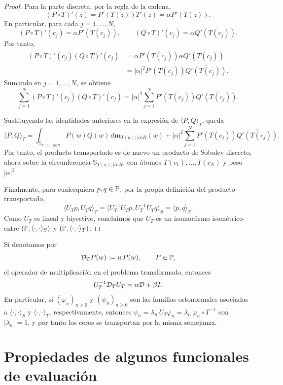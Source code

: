 \begin{proof}
	Para la parte discreta, por la regla de la cadena,
	\[
		(P\circ T)'(z)=P'(T(z))T'(z)=\alpha P'(T(z)).
	\]
	En particular, para cada $j=1,\dots,N$,
	\[
		(P\circ T)'(c_j)=\alpha P'(T(c_j)),
		\qquad
		(Q\circ T)'(c_j)=\alpha Q'(T(c_j)).
	\]
	Por tanto,
	\[
		\begin{aligned}
			(P\circ T)'(c_j)
			\overline{(Q\circ T)'(c_j)}
			 & =
			\alpha P'(T(c_j))
			\overline{\alpha Q'(T(c_j))} \\
			 & =
			|\alpha|^2
			P'(T(c_j))\overline{Q'(T(c_j))}.
		\end{aligned}
	\]
	Sumando en $j=1,\dots,N$, se obtiene
	\[
		\sum_{j=1}^N
		(P\circ T)'(c_j)\overline{(Q\circ T)'(c_j)}
		=
		|\alpha|^2
		\sum_{j=1}^N
		P'(T(c_j))\overline{Q'(T(c_j))}.
	\]

	Sustituyendo las identidades anteriores en la expresión de
	$\langle P,Q\rangle_T$, queda
	\[
		\langle P,Q\rangle_T
		=
		\int_{\mathbb S_{T(a),|\alpha|R}}
		P(w)\overline{Q(w)}\,d\mathbf m_{T(a);|\alpha|R}(w)
		+
		|\alpha|^2
		\sum_{j=1}^N
		P'(T(c_j))\overline{Q'(T(c_j))}.
	\]
	Por tanto, el producto transportado es de nuevo un producto de Sobolev
	discreto, ahora sobre la circunferencia $\mathbb S_{T(a),|\alpha|R}$, con
	átomos $T(c_1),\dots,T(c_N)$ y peso $|\alpha|^2$.

	Finalmente, para cualesquiera $p,q\in\mathbb{P}$, por la propia definición del
	producto transportado,
	\[
		\langle U_Tp,U_Tq\rangle_T
		=
		\langle U_T^{-1}U_Tp,U_T^{-1}U_Tq\rangle_S
		=
		\langle p,q\rangle_S.
	\]
	Como $U_T$ es lineal y biyectivo, concluimos que $U_T$ es un isomorfismo
	isométrico entre
	$(\mathbb{P},\langle\cdot,\cdot\rangle_S)$ y
	$(\mathbb{P},\langle\cdot,\cdot\rangle_T)$.
\end{proof}

\begin{rmk}
	Si denotamos por
	\[
		\mathcal D_T P(w):=wP(w),
		\qquad P\in\mathbb{P},
	\]
	el operador de multiplicación en el problema transformado, entonces
	\[
		U_T^{-1}\mathcal D_TU_T=\alpha\mathcal{D}+\beta I.
	\]
	En particular, si $(\varphi_n)_{n\ge 0}$ y $(\psi_n)_{n\ge 0}$ son las familias ortonormales asociadas a $\langle\cdot,\cdot\rangle_S$ y $\langle\cdot,\cdot\rangle_T$, respectivamente, entonces $\psi_n=\lambda_n\,U_T\varphi_n=\lambda_n\,\varphi_n\circ T^{-1}$ con $|\lambda_n|=1$, y por tanto los ceros se transportan por la misma semejanza.
\end{rmk}

\section{Propiedades de algunos funcionales de evaluación}

